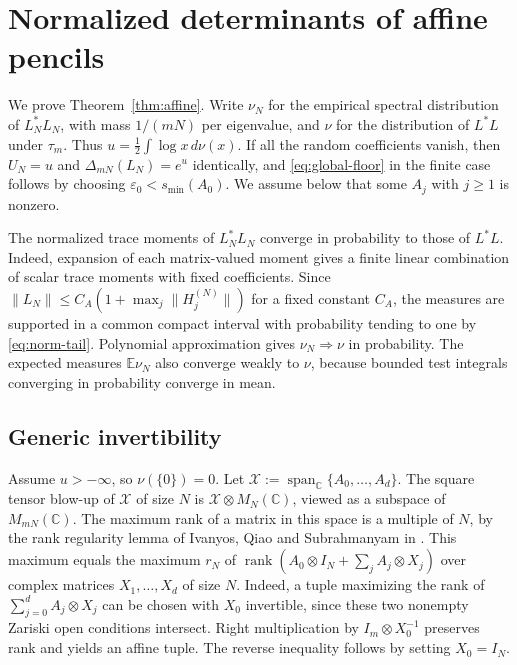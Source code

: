 \section{Normalized determinants of affine pencils}\label{sec:affine}

We prove Theorem~\ref{thm:affine}.
Write $\nu_N$ for the empirical spectral distribution of $L_N^*L_N$, with mass $1/(mN)$ per eigenvalue, and $\nu$ for the distribution of $L^*L$ under $\tau_m$.
Thus $u=\frac12\int\log x\,d\nu(x)$.
If all the random coefficients vanish, then $U_N=u$ and $\Delta_{mN}(L_N)=e^u$ identically, and \eqref{eq:global-floor} in the finite case follows by choosing $\varepsilon_0<s_{\min}(A_0)$.
We assume below that some $A_j$ with $j\ge1$ is nonzero.

The normalized trace moments of $L_N^*L_N$ converge in probability to those of $L^*L$.
Indeed, expansion of each matrix-valued moment gives a finite linear combination of scalar trace moments with fixed coefficients.
Since $\|L_N\|\le C_A(1+\max_j\|H_j^{(N)}\|)$ for a fixed constant $C_A$, the measures are supported in a common compact interval with probability tending to one by \eqref{eq:norm-tail}.
Polynomial approximation gives $\nu_N\Rightarrow\nu$ in probability.
The expected measures $\mathbb E\nu_N$ also converge weakly to $\nu$, because bounded test integrals converging in probability converge in mean.

\subsection{Generic invertibility}\label{subsec:generic-invertibility}

Assume $u>-\infty$, so $\nu(\{0\})=0$.
Let $\mathcal X:=\operatorname{span}_{\mathbb C}\{A_0,\ldots,A_d\}$.
The square tensor blow-up of $\mathcal X$ of size $N$ is $\mathcal X\otimes M_N(\mathbb C)$, viewed as a subspace of $M_{mN}(\mathbb C)$.
The maximum rank of a matrix in this space is a multiple of $N$, by the rank regularity lemma of Ivanyos, Qiao and Subrahmanyam in \cite[Definitions~2.1--2.2 and Proposition~2.3]{DM17}.
This maximum equals the maximum $r_N$ of $\operatorname{rank}(A_0\otimes I_N+\sum_j A_j\otimes X_j)$ over complex matrices $X_1,\ldots,X_d$ of size $N$.
Indeed, a tuple maximizing the rank of $\sum_{j=0}^d A_j\otimes X_j$ can be chosen with $X_0$ invertible, since these two nonempty Zariski open conditions intersect.
Right multiplication by $I_m\otimes X_0^{-1}$ preserves rank and yields an affine tuple.
The reverse inequality follows by setting $X_0=I_N$.

